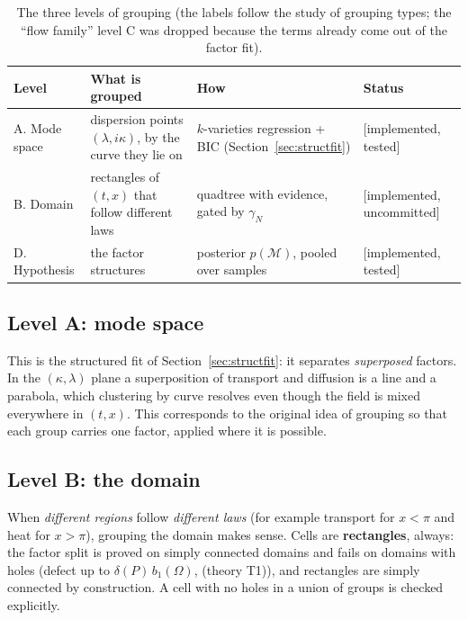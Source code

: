 \documentclass[11pt,a4paper]{article}
\theoremstyle{definition}
\newcommand{\badge}[2]{\textcolor{#1}{\textsf{\footnotesize[#2]}}}
\newcommand{\impl}{\badge{cC}{implemented, tested}}
\newcommand{\implu}{\badge{cD}{implemented, uncommitted}}
\newcommand{\thy}[1]{\textcolor{cG}{\textsf{\footnotesize(theory #1)}}}
\begin{document}
\begin{table}[!htb]
\centering\small
\begin{tabular}{@{}L{2.5cm}L{4.1cm}L{4.5cm}L{2.2cm}@{}}
\toprule
Level & What is grouped & How & Status\\\midrule
A. Mode space & dispersion points $(\lambda,i\kappa)$, by the curve they lie on & $k$-varieties regression + BIC (Section~\ref{sec:structfit}) & \impl{}\\
B. Domain & rectangles of $(t,x)$ that follow different laws & quadtree with evidence, gated by $\gamma_N$ & \implu{}\\
D. Hypothesis & the factor structures & posterior $p(\mathcal M)$, pooled over samples & \impl{}\\
\bottomrule
\end{tabular}
\caption{The three levels of grouping (the labels follow the study of grouping types; the ``flow family'' level C was dropped because the terms already come out of the factor fit).}
\end{table}

\subsection{Level A: mode space}
This is the structured fit of Section~\ref{sec:structfit}: it separates \emph{superposed} factors. In the $(\kappa,\lambda)$ plane a superposition of transport and diffusion is a line and a parabola, which clustering by curve resolves even though the field is mixed everywhere in $(t,x)$. This corresponds to the original idea of grouping so that each group carries one factor, applied where it is possible.

\subsection{Level B: the domain}
When \emph{different regions} follow \emph{different laws} (for example transport for $x<\pi$ and heat for $x>\pi$), grouping the domain makes sense. Cells are \textbf{rectangles}, always: the factor split is proved on simply connected domains and fails on domains with holes (defect up to $\delta(P)\,b_1(\Omega)$, \thy{T1}), and rectangles are simply connected by construction. A cell with no holes in a union of groups is checked explicitly.
\end{document}
